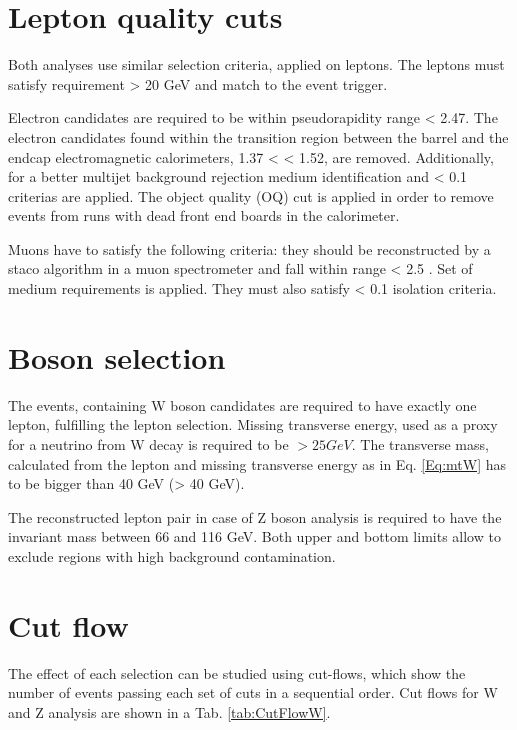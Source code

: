 \section{Lepton quality cuts}

Both analyses use similar selection criteria, applied on leptons. The leptons must satisfy requirement \ptl > 20 GeV and match to the event trigger.

Electron candidates are required to be within pseudorapidity range \etall < 2.47. The electron candidates found within the transition region between the barrel and the endcap electromagnetic calorimeters, 1.37 < \etall < 1.52, are removed.  Additionally, for a better multijet background rejection  medium identification and \ptcone < 0.1 criterias are applied. The object quality (OQ) cut is applied in order to remove events from runs with dead front end boards in the calorimeter. 

Muons have to satisfy the following criteria: they should be reconstructed by a staco algorithm in a muon spectrometer and fall within range \etall < 2.5 . Set of medium requirements is applied. They must also satisfy \ptcone < 0.1 isolation criteria.

\section{Boson selection}
The events, containing W boson candidates are required to have exactly one lepton, fulfilling the lepton selection. Missing transverse energy, used as a proxy for a neutrino from W decay is required to be \etmiss $>25 GeV$.  The transverse mass, calculated from the lepton and missing transverse energy as in Eq. \ref{Eq:mtW} has to be bigger than 40 GeV (\mtw > 40 GeV). 

The reconstructed lepton pair in case of Z boson analysis is required to have the invariant mass between 66 and 116 GeV. Both upper and bottom limits allow to exclude regions with high background contamination. 

\section{Cut flow}

The effect of each selection can be studied using cut-flows, which show the number of events passing each set of cuts in a sequential order. Cut flows for W and Z analysis are shown in a Tab. \ref{tab:CutFlowW}.

